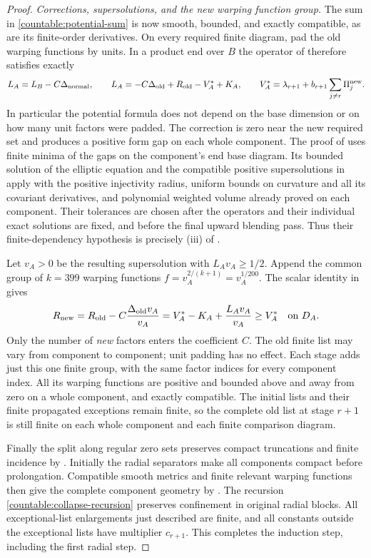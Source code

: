 \begin{proof}
\emph{Corrections, supersolutions, and the new warping function group.}
The sum in \eqref{countable:potential-sum} is now smooth, bounded, and
exactly compatible, as are its finite-order derivatives. On every
required finite diagram, pad the old warping functions by units. In a product end
over $B$ the operator of  therefore satisfies
exactly
\[
 L_A=L_B-C\Delta_{\rm normal},\qquad
 L_A=-C\Delta_{\rm old}+R_{\rm old}-V_A^*+K_A,
 \qquad
 V_A^*=\lambda_{r+1}+b_{r+1}\sum_{j\ne r}\Pi_j^{\rm new}.
\]
In particular the potential formula does not depend on the base
dimension or on how many unit factors were padded. The correction is
zero near the new required set and produces a positive form gap on
each whole component. The proof of  uses finite
minima of the gaps on the component's end base diagram. Its bounded solution of the elliptic equation
and the compatible positive supersolutions in
 apply with the positive injectivity radius, uniform bounds on curvature and all
its covariant derivatives, and polynomial weighted volume already proved
on each component.
Their tolerances are chosen after the operators and their individual
exact solutions are fixed, and before the final upward blending pass.
Thus their finite-dependency hypothesis is precisely (iii) of
.

Let $v_A>0$ be the resulting supersolution with $L_Av_A\ge1/2$.
Append the common group of $k=399$ warping functions
$f=v_A^{2/(k+1)}=v_A^{1/200}$. The scalar identity in
 gives
\[
 R_{\rm new}=R_{\rm old}-C\frac{\Delta_{\rm old}v_A}{v_A}
           =V_A^*-K_A+\frac{L_Av_A}{v_A}
           \ge V_A^*\quad\hbox{on }D_A.
\]
Only the number of \emph{new} factors enters the coefficient $C$.
The old finite list may vary from component to component; unit padding has
no effect. Each stage adds just this one finite group, with the same
factor indices for every component index. All its warping functions are positive and bounded
above and away from zero on a whole component, and exactly compatible.
The initial lists and their finite propagated exceptions remain finite,
so the complete old list at stage $r+1$ is still finite on each whole
component and each finite comparison diagram.

Finally the split along regular zero sets preserves compact truncations and finite
incidence by . Initially the radial separators make
all components compact before prolongation. Compatible smooth metrics
and finite relevant warping functions then give the complete component geometry by
. The recursion
\eqref{countable:collapse-recursion} preserves confinement in original
radial blocks. All exceptional-list enlargements just described are
finite, and all constants outside the exceptional lists have multiplier $c_{r+1}$.
This completes the induction step, including the first radial step.
\end{proof}

